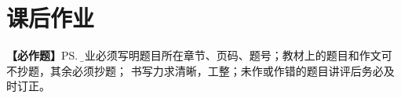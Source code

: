 % 	
% 		
	



\newpage

\section*{课后作业}

{\bf 【必作题】}\ps{\b 作业必须写明题目所在章节、页码、题号；教材上的题目和作文可不抄题，其余必须抄题；
书写力求清晰，工整；未作或作错的题目讲评后务必及时订正。}


